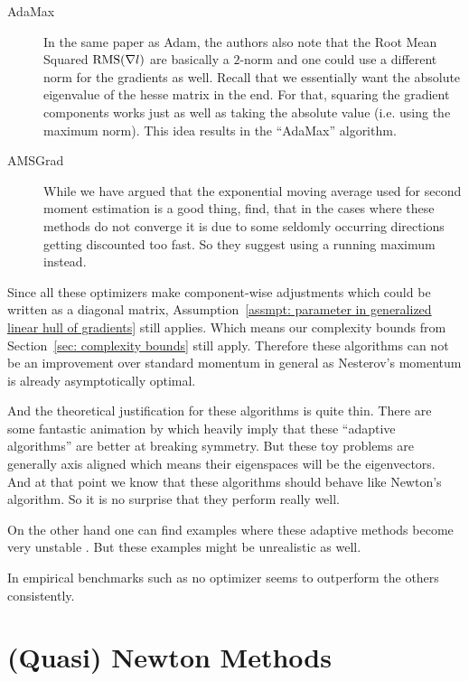 \begin{description}
	\item[AdaMax] \parencite{kingmaAdamMethodStochastic2017} In the same paper
	as Adam, the authors also note that the Root Mean Squared
	\(\text{RMS}(\nabla l)\) are basically a \(2\)-norm and one could use a
	different norm for the gradients as well.  Recall that we essentially want
	the absolute eigenvalue of the hesse matrix in the end. For that, squaring
	the gradient components works just as well as taking the absolute value (i.e.
	using the maximum norm). This idea results in the ``AdaMax'' algorithm.

	\item[AMSGrad] \parencite{reddiConvergenceAdam2019} While we have argued that
	the exponential moving average used for second moment estimation is a good
	thing, \textcite{reddiConvergenceAdam2019} find, that in the cases where
	these methods do not converge it is due to some seldomly occurring directions
	getting discounted too fast. So they suggest using a running maximum instead.
\end{description}

Since all these optimizers make component-wise adjustments which could be written
as a diagonal matrix, Assumption~\ref{assmpt: parameter in generalized linear
hull of gradients} still applies. Which means our complexity bounds from
Section~\ref{sec: complexity bounds} still apply. Therefore these algorithms
can not be an improvement over standard momentum in general as Nesterov's
momentum is already asymptotically optimal.

And the theoretical justification for these algorithms is quite thin. There
are some fantastic animation by \textcite{radfordVisualizingOptimizationAlgos2014}
which heavily imply that these ``adaptive algorithms'' are better at breaking
symmetry. But these toy problems are generally axis aligned which means their
eigenspaces will be the eigenvectors. And at that point we know that these
algorithms should behave like Newton's algorithm. So it is no surprise that they
perform really well.

On the other hand one can find examples where these adaptive methods become very
unstable
\parencite[e.g.][]{wilsonMarginalValueAdaptive2018,reddiConvergenceAdam2019}.
But these examples might be unrealistic as well.

In empirical benchmarks such as \textcite{schmidtDescendingCrowdedValley2021} no
optimizer seems to outperform the others consistently.


\section{(Quasi) Newton Methods}

